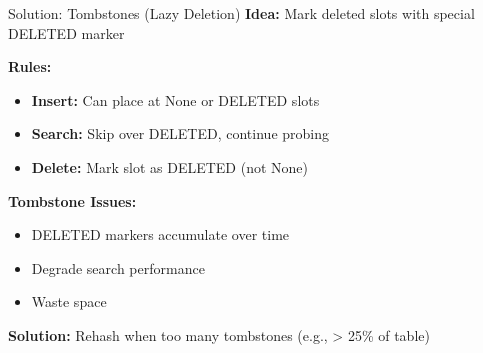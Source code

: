\documentclass[aspectratio=169]{beamer}
\begin{document}
\begin{frame}{Solution: Tombstones (Lazy Deletion)}
  \textbf{Idea:} Mark deleted slots with special DELETED marker

  \vspace{0.3cm}
  \textbf{Rules:}
  \begin{itemize}
    \item \textbf{Insert:} Can place at None or DELETED slots
    \item \textbf{Search:} Skip over DELETED, continue probing
    \item \textbf{Delete:} Mark slot as DELETED (not None)
  \end{itemize}

  \vspace{0.3cm}
  \begin{center}
  \end{center}

  \vspace{0.3cm}
  \textbf{Tombstone Issues:}
  \begin{itemize}
    \item DELETED markers accumulate over time
    \item Degrade search performance
    \item Waste space
  \end{itemize}

  \vspace{0.3cm}
  \textbf{Solution:} Rehash when too many tombstones (e.g., > 25\% of table)
\end{frame}
\end{document}

